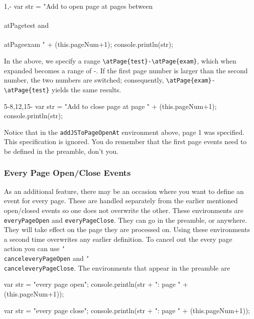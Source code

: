 \documentclass{article}
\newcommand{\cs}[1]{\texttt{\char`\\#1}}
\newenvironment{sverbatim}
{\par\footnotesize\verbatim}{\endverbatim}
\begin{document}
\begin{sverbatim}
\begin{addJSToPageOpenAt}{1,-}
var str = "Add to open page at pages between \\\\atPage{test} and \\\\atPage{exam} "
    + (this.pageNum+1);
console.println(str);
\end{addJSToPageOpenAt}
\end{sverbatim}
In the above, we specify a range \verb!\atPage{test}-\atPage{exam}!, which when expanded
becomes a range of \pageref*{test}-\pageref*{exam}. If the first page number is larger than
the second number, the two numbers are switched; consequently, \verb!\atPage{exam}-\atPage{test}!
yields the same results.
\begin{sverbatim}
\begin{addJSToPageCloseAt}{5-8,12,15-}
var str = "Add to close page at page " + (this.pageNum+1);
console.println(str);
\end{addJSToPageCloseAt}
\end{sverbatim}
Notice that in the \texttt{addJSToPageOpenAt} environment above,
page 1 was specified. This specification is ignored. You do remember
that the first page events need to be defined in the preamble, don't
you.

\subsubsection{Every Page Open/Close Events}

As an additional feature, there may be an occasion where you want to
define an event for every page. These are handled separately from the earlier
mentioned open/closed events so one does not overwrite the other. These environments
are \texttt{everyPageOpen} and \texttt{everyPageClose}. They can go in the preamble, or anywhere.
They will take effect on the page they are processed on.  Using these environments a second time
overwrites any earlier definition. To cancel out the every page action you can use
\cs{canceleveryPageOpen} and \cs{canceleveryPageClose}.  The environments that appear
in the preamble are

\begin{sverbatim}
\begin{everyPageOpen}
var str = "every page open";
console.println(str + ": page " + (this.pageNum+1));
\end{everyPageOpen}

\begin{everyPageClose}
var str = "every page close";
console.println(str + ": page " + (this.pageNum+1));
\end{everyPageClose}
\end{sverbatim}
\end{document}

